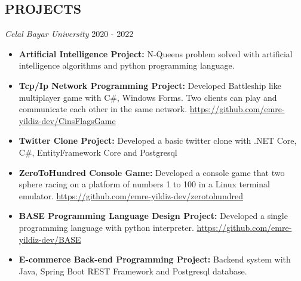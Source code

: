 \documentclass[line,margin]{res}
\begin{document}
\begin{resume}
\begin{itemize}
\section{PROJECTS}{\sl Celal Bayar University} \hfill        2020 - 2022 \\
                  \begin{itemize}
                   \item \textbf{Artificial Intelligence Project: } N-Queens problem solved with artificial intelligence algorithms and python programming language. 
                   \item \textbf{Tcp/Ip Network Programming Project: } Developed Battleship like multiplayer game with C\#, Windows Forms. Two clients can play and communicate each other in the same network. \href{https://github.com/emre-yildiz-dev/CinsFlagsGame}{https://github.com/emre-yildiz-dev/CinsFlagsGame}
                   \item \textbf{Twitter Clone Project: } Developed a basic twitter clone with .NET Core, C\#, EntityFramework Core and Postgresql
                    \item \textbf{ZeroToHundred Console Game: } Developed a console game that two sphere racing on a platform of numbers 1 to 100 in a Linux terminal emulator. \href{https://github.com/emre-yildiz-dev/zerotohundred}{https://github.com/emre-yildiz-dev/zerotohundred} 
                     \item \textbf{BASE Programming Language Design Project: } Developed a single programming language with python interpreter. \href{https://github.com/emre-yildiz-dev/BASE}{https://github.com/emre-yildiz-dev/BASE}
                     \item \textbf{E-commerce Back-end Programming Project: } Backend system with Java, Spring Boot REST Framework and Postgresql database.
                      

\end{itemize}
\end{itemize}
\end{resume}
\end{document}
